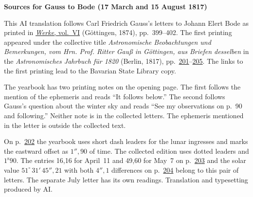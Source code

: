 \clearpage\thispagestyle{empty}
\begin{center}\textbf{Sources for Gauss to Bode (17 March and 15 August 1817)}\end{center}
\noindent This AI translation follows Carl Friedrich Gauss’s letters to Johann Elert Bode as printed in \href{https://gdz.sub.uni-goettingen.de/id/PPN236007467}{\textit{Werke}, vol.~VI} (Göttingen, 1874), pp.~399--402. The first printing appeared under the collective title \textit{Astronomische Beobachtungen und Bemerkungen, vom Hrn. Prof. Ritter Gauß in Göttingen, aus Briefen desselben} in the \textit{Astronomisches Jahrbuch für 1820} (Berlin, 1817), pp.~\href{https://api.digitale-sammlungen.de/iiif/image/v2/bsb10538349_00205/full/1600,/0/default.jpg}{201}--\href{https://api.digitale-sammlungen.de/iiif/image/v2/bsb10538349_00209/full/1600,/0/default.jpg}{205}. The links to the first printing lead to the Bavarian State Library copy.
\par\smallskip\noindent The yearbook has two printing notes on the opening page. The first follows the mention of the ephemeris and reads “It follows below.” The second follows Gauss’s question about the winter sky and reads “See my observations on p.~90 and following.” Neither note is in the collected letters. The ephemeris mentioned in the letter is outside the collected text.
\par\smallskip\noindent On p.~\href{https://api.digitale-sammlungen.de/iiif/image/v2/bsb10538349_00206/full/1600,/0/default.jpg}{202} the yearbook uses short dash leaders for the lunar ingresses and marks the eastward offset as $1''{,}90$ of time. The collected edition uses dotted leaders and $1^{\mathrm s}90$. The entries 16,16 for April~11 and 49,60 for May~7 on p.~\href{https://api.digitale-sammlungen.de/iiif/image/v2/bsb10538349_00207/full/1600,/0/default.jpg}{203} and the solar value $51^\circ\,31'\,45''{,}21$ with both $4''{,}1$ differences on p.~\href{https://api.digitale-sammlungen.de/iiif/image/v2/bsb10538349_00208/full/1600,/0/default.jpg}{204} belong to this pair of letters. The separate July letter has its own readings. Translation and typesetting produced by AI.
\clearpage
